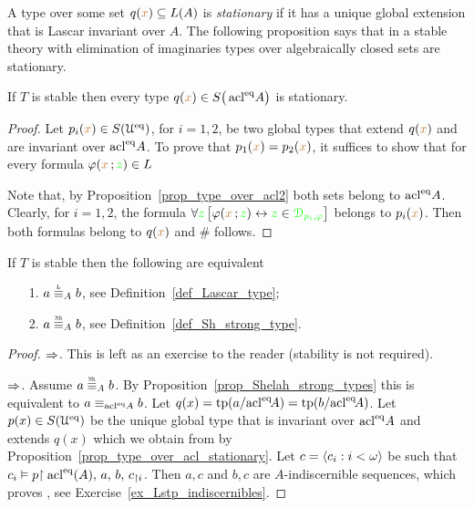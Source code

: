 \documentclass[creche.tex]{subfiles}
\begin{document}
A type over some set $q({\color{brown} x})\subseteq L(A)$ is \emph{stationary\/} if it has a unique global extension that is Lascar invariant over $A$. The following proposition says that in a stable theory with elimination of imaginaries types over algebraically closed sets are stationary.

\begin{proposition}\label{prop_type_over_acl_stationary} If $T$ is stable then every type $q({\color{brown} x})\in S\big(\mathop{\rm acl}^{{\rm eq}}\!A\big)$ is stationary.
\end{proposition}

\begin{proof}
Let $p_i({\color{brown} x})\in S(\EuScript U^{{\rm eq}})$, for $i=1,2$, be two global types that extend $q({\color{brown} x})$ and are invariant over $\mathop{\rm acl}^{{\rm eq}}\!A$. To prove that $p_1({\color{brown} x}) =p_2({\color{brown} x})$, it suffices to show that for every formula $\varphi({\color{brown} x}\,;{\color{green} z})\in L$


Note that, by Proposition~\ref{prop_type_over_acl2} both sets belong to  $\mathop{\rm acl}^{{\rm eq}}\!A$. Clearly, for $i=1,2$, the formula $\forall{\color{green}z}\,\big[\varphi({\color{brown} x}\,;{\color{green} z})\leftrightarrow {\color{green}z}\in {\color{green}\EuScript D_{p_i,\varphi}}\big]$ belongs to $p_i({\color{brown} x})$. Then both formulas belong to $q({\color{brown} x})$ and $\#$ follows.
\end{proof}


\begin{corollary}
If $T$ is stable then the following are equivalent
\begin{itemize}
\item[1.] $a\equivL_A b$, see Definition~\ref{def_Lascar_type};
\item[2.] $a\equivSh_A b$, see Definition~\ref{def_Sh_strong_type}.
\end{itemize}
\end{corollary}
\begin{proof}$\Rightarrow$. This is left as an exercise to the reader (stability is not required).

$\Rightarrow$. Assume $a\equivSh_A b$. By Proposition~\ref{prop_Shelah_strong_types} this is equivalent to $a\equiv_{\mathop{\rm acl}^{{\rm eq}}\!A} b$. Let $q(x)={\rm tp}(a/{\mathop{\rm acl}}^{{\rm eq}}\!A)={\rm tp}(b/{\mathop{\rm acl}}^{{\rm eq}}\!A)$. Let $p(x)\in S(\EuScript U^{{\rm eq}})$ be the unique global type that is invariant over $\mathop{\rm acl}^{{\rm eq}}\! A$ and extends $q(x)$ which we obtain from by Proposition~\ref{prop_type_over_acl_stationary}. Let $c=\langle c_i:i<\omega\rangle$ be such that $c_i\vDash p{\restriction \mathop{\rm acl}^{{\rm eq}}(A),\,a,\,b,\,c_{\restriction i}}$. Then $a,c$ and $b,c$ are $A$-indiscernible sequences, which proves , see Exercise~\ref{ex_Lstp_indiscernibles}.
\end{proof}
\end{document}
